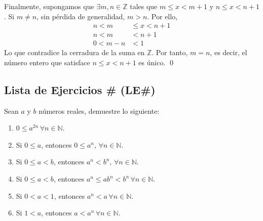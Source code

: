 \documentclass[11pt]{article}
\newcommand{\N}{\mathbb{N}}
\newcommand{\Z}{\mathbb{Z}}
\let\set\Set
\begin{document}
\begin{enumerate}[label=\alph*)]
    Finalmente, supongamos que $\exists m, n\in \Z$ tales que $m\leq x<m+1$ y $n\leq x<n+1$. Si $m\neq n$, sin pérdida de generalidad, $m>n$. Por ello, \begin{align*}
        n < m &\leq x<n+1 \\
        n < m &<n+1 \\
        0 < m-n &<1
    \end{align*}  
    Lo que contradice la cerradura de la suma en $\Z$. Por tanto, $m=n$, es decir, el número entero que satisface $n\leq x<n+1$ es único. \qed
%    
%
\end{enumerate}

\subsection*{Lista de Ejercicios \# (LE\#)}

Sean $a$ y $b$ números reales, demuestre lo siguiente:

\begin{enumerate}[label=\alph*)]
    \item $0 \leq a^{2n} \, \forall n\in \N$.
    \item Si $0\leq a$, entonces $ 0 \leq a^n, \, \forall n\in \N$.
    \item Si $0 \leq a <b$, entonces $a^n < b^n, \, \forall n\in \N$.
    \item Si $0 \leq a <b$, entonces $a^n \leq ab^n < b^n \, \forall n\in \N$.
    \item Si $0<a<1$, entonces $a^n<a \, \forall n\in \N$.
    \item Si $1<a$, entonces $a<a^n \, \forall n\in \N$.
\end{enumerate}
\end{document}
